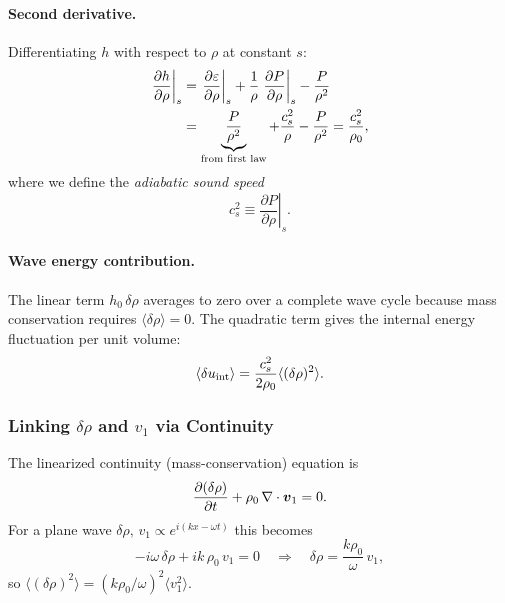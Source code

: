 \paragraph{Second derivative.}
Differentiating $h$ with respect to $\rho$ at constant $s$:
\begin{align}
    \left.\frac{\partial h}{\partial\rho}\right|_s
    &=
    \left.\frac{\partial\varepsilon}{\partial\rho}\right|_s
    + \frac{1}{\rho}\left.\frac{\partial P}{\partial\rho}\right|_s
    - \frac{P}{\rho^2}
    \notag\\
    &=
    \underbrace{\frac{P}{\rho^2}}_{\text{from first law}}
    + \frac{c_s^2}{\rho}
    - \frac{P}{\rho^2}
    =
    \frac{c_s^2}{\rho_0},
    \label{eq:lec10:d2}
\end{align}
where we define the \emph{adiabatic sound speed}
\begin{equation}
    \boxed{
    c_s^2 \equiv \left.\frac{\partial P}{\partial\rho}\right|_s.
    }
    \label{eq:lec10:cs-def}
\end{equation}

\paragraph{Wave energy contribution.}
The linear term $h_0\,\delta\rho$ averages to zero over a complete wave cycle
because mass conservation requires $\langle\delta\rho\rangle = 0$. The
quadratic term gives the internal energy fluctuation per unit volume:
\begin{equation}
    \langle\delta u_{\rm int}\rangle
    = \frac{c_s^2}{2\rho_0}\langle(\delta\rho)^2\rangle.
    \label{eq:lec10:u-int-wave}
\end{equation}

\subsubsection*{Linking $\delta\rho$ and $v_1$ via Continuity}

The linearized continuity (mass-conservation) equation is
\begin{equation}
    \frac{\partial(\delta\rho)}{\partial t}
    + \rho_0\,\nabla\cdot\vb*{v}_1 = 0.
    \label{eq:lec10:continuity}
\end{equation}
For a plane wave $\delta\rho,\,v_1 \propto e^{i(kx-\omega t)}$ this becomes
\begin{equation}
    -i\omega\,\delta\rho + i k\,\rho_0\,v_1 = 0
    \quad\Longrightarrow\quad
    \delta\rho = \frac{k\rho_0}{\omega}\,v_1,
    \label{eq:lec10:continuity-plane}
\end{equation}
so $\langle(\delta\rho)^2\rangle = (k\rho_0/\omega)^2\langle v_1^2\rangle$.

